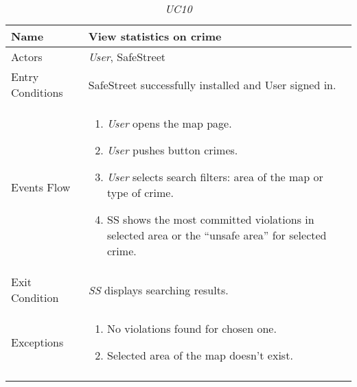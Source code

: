 \documentclass[../../../RASD.tex]{subfiles}
\begin{document}
    \begin{center}
        \begin{longtable}{| p{.35\linewidth} | p{.65\linewidth} |}
            \hline
            \textbf{Name} & \textbf{View statistics on crime}\\ \hline
            Actors & \textit{User}, SafeStreet\\ \hline
            Entry Conditions & SafeStreet successfully installed and User signed in.\\ \hline
            Events Flow &
            \begin{enumerate}
                \item \textit{User} opens the map page.
                \item \textit{User} pushes button crimes.
                \item \textit{User} selects search filters: area of the map or type of crime.
                \item  SS shows the most committed violations in selected area or the “unsafe area” for selected crime.
            \end{enumerate}
            \\ \hline
            Exit Condition & \textit{SS} displays searching results.\\ \hline
            Exceptions &
            \begin{enumerate}
                \item No violations found for chosen one.
                \item Selected area of the map doesn’t exist.
            \end{enumerate}
            \\
            \hline
            \caption{\textit{UC10}}
        \end{longtable}
    \end{center}
    \newpage
\end{document}
